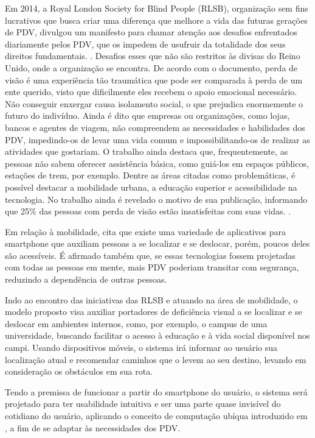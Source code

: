 \documentclass[english,brazilian]{UNISINOSmonografia}
\begin{document}
Em 2014, a Royal London Society for Blind People (RLSB), organização sem fins lucrativos que busca criar uma diferença que melhore a vida das futuras gerações de PDV, divulgou um manifesto para chamar atenção aos desafios enfrentados diariamente pelos PDV, que os impedem de usufruir da totalidade dos seus direitos fundamentais. \cite{YouthManifesto}. Desafios esses que não são restritos às divisas do Reino Unido, onde a organização se encontra.
De acordo com o documento, perda de visão é uma experiência tão traumática que pode ser comparada à perda de um ente querido, visto que dificilmente eles recebem o apoio emocional necessário. Não conseguir enxergar causa isolamento social, o que prejudica enormemente o futuro do indivíduo. Ainda é dito que empresas ou organizações, como lojas, bancos e agentes de viagem, não compreendem as necessidades e habilidades dos PDV, impedindo-os de levar uma vida comum e impossibilitando-os de realizar as atividades que gostariam. O trabalho ainda destaca que, frequentemente, as pessoas não sabem oferecer assistência básica, como guiá-los em espaços públicos, estações de trem, por exemplo. Dentre as áreas citadas como problemáticas, é possível destacar a mobilidade urbana, a educação superior e acessibilidade na tecnologia. No trabalho ainda é revelado o motivo de sua publicação, informando que 25\% das pessoas com perda de visão estão insatisfeitas com suas vidas. \cite{YouthManifesto}.

Em relação à mobilidade,  cita que existe uma variedade de aplicativos para smartphone que auxiliam pessoas a se localizar e se deslocar, porém, poucos deles são acessíveis. É afirmado também que, se essas tecnologias fossem projetadas com todas as pessoas em mente, mais PDV poderiam transitar com segurança, reduzindo a dependência de outras pessoas. 

Indo ao encontro das iniciativas das RLSB e atuando na área de mobilidade, o modelo proposto visa auxiliar portadores de deficiência visual a se localizar e se deslocar em ambientes internos, como, por exemplo, o campus de uma universidade, buscando facilitar o acesso à educação e à vida social disponível nos campi. Usando dispositivos móveis, o sistema irá informar ao usuário sua localização atual e recomendar caminhos que o levem ao seu destino, levando em consideração os obstáculos em sua rota.

Tendo a premissa de funcionar a partir do smartphone do usuário, o sistema será projetado para ter usabilidade intuitiva e ser uma parte quase invisível do cotidiano do usuário, aplicando o conceito de computação ubíqua introduzido em , a fim de se adaptar às necessidades dos PDV.
\end{document}
